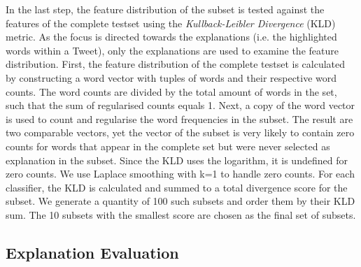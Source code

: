 In the last step, the feature distribution of the subset is tested against the features of the complete testset using the \textit{Kullback-Leibler Divergence} (KLD) metric. As the focus is directed towards the explanations (i.e. the highlighted words within a Tweet), only the explanations are used to examine the feature distribution. First, the feature distribution of the complete testset is calculated by constructing a word vector with tuples of words and their respective word counts. The word counts are divided by the total amount of words in the set, such that the sum of regularised counts equals 1. Next, a copy of the word vector is used to count and regularise the word frequencies in the subset. The result are two comparable vectors, yet the vector of the subset is very likely to contain zero counts for words that appear in the complete set but were never selected as explanation in the subset. Since the KLD uses the logarithm, it is undefined for zero counts. We use Laplace smoothing with k=1 to handle zero counts. For each classifier, the KLD is calculated and summed to a total divergence score for the subset.\newline
We generate a quantity of 100 such subsets and order them by their KLD sum. The 10 subsets with the smallest score are chosen as the final set of subsets.\newline




\subsection{Explanation Evaluation}


